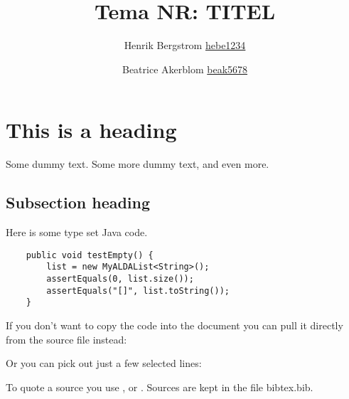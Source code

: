 \documentclass[a5paper,10pt,oneside]{article}
\title{Tema NR: TITEL}
\author{Henrik Bergstrom \url{hebe1234} \and Beatrice Akerblom \url{beak5678}}
\begin{document}
\maketitle


\section{This is a heading}

Some dummy text. Some more dummy text, and even more. 

\subsection{Subsection heading}

Here is some type set Java code. 

\begin{lstlisting}
	public void testEmpty() {
		list = new MyALDAList<String>();
		assertEquals(0, list.size());
		assertEquals("[]", list.toString());
	}
\end{lstlisting}

If you don't want to copy the code into the document you can pull it directly from the source file instead:



Or you can pick out just a few selected lines:



To quote a source you use \cite{Weiss}, or \cite[sid. 25]{Weiss}. Sources are kept in the file bibtex.bib.



\end{document}
